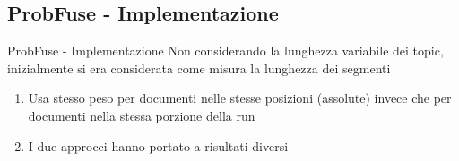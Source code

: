 \subsection{ProbFuse - Implementazione}
\begin{frame}{ProbFuse - Implementazione}
	Non considerando la lunghezza variabile dei topic, inizialmente si era considerata come misura la lunghezza dei segmenti\\
	\bigskip
	\begin{enumerate}
		\item Usa stesso peso per documenti nelle stesse posizioni (assolute) invece che per documenti nella stessa porzione della run
		\item I due approcci hanno portato a risultati diversi
	\end{enumerate}
\end{frame}